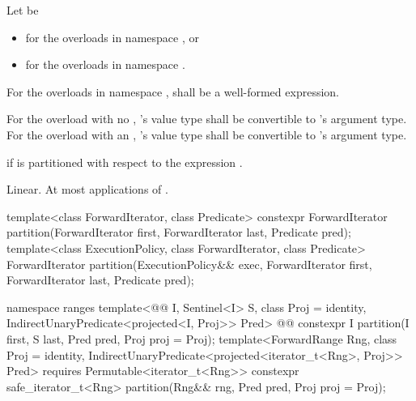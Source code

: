 \begin{itemdescr}
\begin{addedblock}
\pnum
Let  be
\begin{itemize}
\item {} for the overloads in namespace , or
\item {} for the overloads in
  namespace .
\end{itemize}

\pnum
\requires
For the overloads in namespace ,
 shall be a well-formed expression.
\end{addedblock}

\begin{removedblock}
\pnum
\requires For the overload with no ,
's value type shall be convertible to 's
argument type.  For the overload with an ,
's value type shall be convertible to 's
argument type.
\end{removedblock}

\pnum
\returns {} if 
 is  partitioned with respect to the expression
 .

\pnum
\complexity Linear. At most  applications of 
.
\end{itemdescr}


%
\begin{itemdecl}
template<class ForwardIterator, class Predicate>
  constexpr ForwardIterator
    partition(ForwardIterator first, ForwardIterator last, Predicate pred);
template<class ExecutionPolicy, class ForwardIterator, class Predicate>
  ForwardIterator
    partition(ExecutionPolicy&& exec,
              ForwardIterator first, ForwardIterator last, Predicate pred);
\end{itemdecl}
\begin{addedblock}
\begin{itemdecl}
namespace ranges {
  template<@@ I, Sentinel<I> S, class Proj = identity,
      IndirectUnaryPredicate<projected<I, Proj>> Pred>
    @@
    constexpr I
      partition(I first, S last, Pred pred, Proj proj = Proj{});
  template<ForwardRange Rng, class Proj = identity,
      IndirectUnaryPredicate<projected<iterator_t<Rng>, Proj>> Pred>
    requires Permutable<iterator_t<Rng>>
    constexpr safe_iterator_t<Rng>
      partition(Rng&& rng, Pred pred, Proj proj = Proj{});
}
\end{itemdecl}
\end{addedblock}

